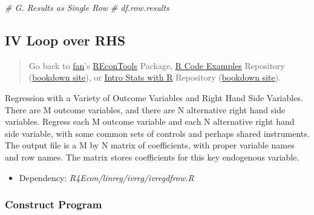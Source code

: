 \documentclass[
]{book}
\newenvironment{Shaded}{\begin{snugshade}}{\end{snugshade}}
\newcommand{\CommentTok}[1]{\textcolor[rgb]{0.56,0.35,0.01}{\textit{#1}}}
\providecommand{\tightlist}{%
  \setlength{\itemsep}{0pt}\setlength{\parskip}{0pt}}
\begin{document}
\begin{Shaded}
\begin{Highlighting}[]
\CommentTok{# G. Results as Single Row}
\CommentTok{# df.row.results}
\end{Highlighting}
\end{Shaded}

\begin{Shaded}
\end{Shaded}

\hypertarget{iv-loop-over-rhs}{%
\subsection{IV Loop over RHS}\label{iv-loop-over-rhs}}

\begin{quote}
Go back to \href{http://fanwangecon.github.io/}{fan}'s \href{https://fanwangecon.github.io/REconTools/}{REconTools} Package, \href{https://fanwangecon.github.io/R4Econ/}{R Code Examples} Repository (\href{https://fanwangecon.github.io/R4Econ/bookdown}{bookdown site}), or \href{https://fanwangecon.github.io/Stat4Econ/}{Intro Stats with R} Repository (\href{https://fanwangecon.github.io/Stat4Econ/bookdown}{bookdown site}).
\end{quote}

Regression with a Variety of Outcome Variables and Right Hand Side Variables. There are M outcome variables, and there are N alternative right hand side variables. Regress each M outcome variable and each N alternative right hand side variable, with some common sets of controls and perhaps shared instruments. The output file is a M by N matrix of coefficients, with proper variable names and row names. The matrix stores coefficients for this key endogenous variable.

\begin{itemize}
\tightlist
\item
  Dependency: \emph{R4Econ/linreg/ivreg/ivregdfrow.R}
\end{itemize}

\hypertarget{construct-program-1}{%
\subsubsection{Construct Program}\label{construct-program-1}}
\end{document}
